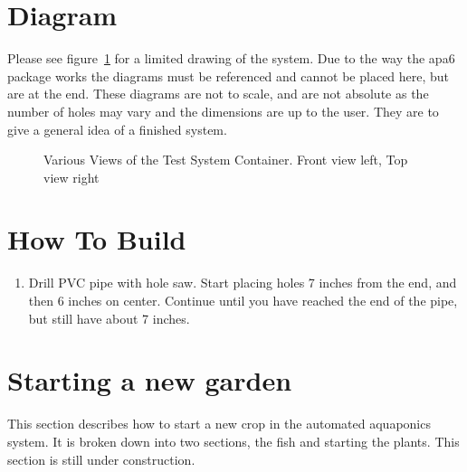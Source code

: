 \documentclass[american,12pt]{article}
\begin{document}
\section{Diagram}
Please see figure~\ref{fig:views} for a limited drawing of the system.
Due to the way the apa6 package works the
diagrams must be referenced and cannot be placed here, but are at the end. These
diagrams are not to scale, and are not absolute as the number of holes may vary
and the dimensions are up to the user. They are to give a general idea of a
finished system.

\begin{figure}[h]
    \centering
    \caption{Various Views of the Test System Container. Front view left, Top
    view right}
    \label{fig:views}
\end{figure}

\section{How To Build}
\begin{enumerate}
    \item Drill PVC pipe with hole saw. Start placing holes 7 inches from the
        end, and then 6 inches on center. Continue until you have reached
        the end of the pipe, but still have about 7 inches.
\end{enumerate}


\section{Starting a new garden}
This section describes how to start a new crop in the automated aquaponics
system. It is broken down into two sections, the fish and starting the plants.
This section is still under construction.
\end{document}
